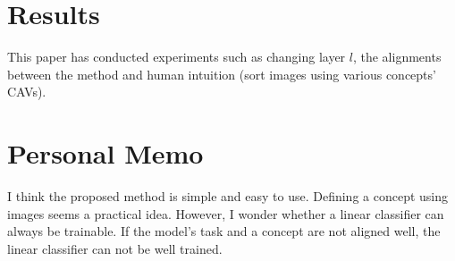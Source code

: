 \documentclass[10pt,twocolumn,letterpaper]{article}
\begin{document}
\section{Results}
This paper has conducted experiments such as changing layer $l$, the alignments between the method and human intuition (sort images using various concepts' CAVs).

\section{Personal Memo}
I think the proposed method is simple and easy to use. Defining a concept using images seems a practical idea. However, I wonder whether a linear classifier can always be trainable. If the model's task and a concept are not aligned well, the linear classifier can not be well trained.

{\small

% 
}
\end{document}
